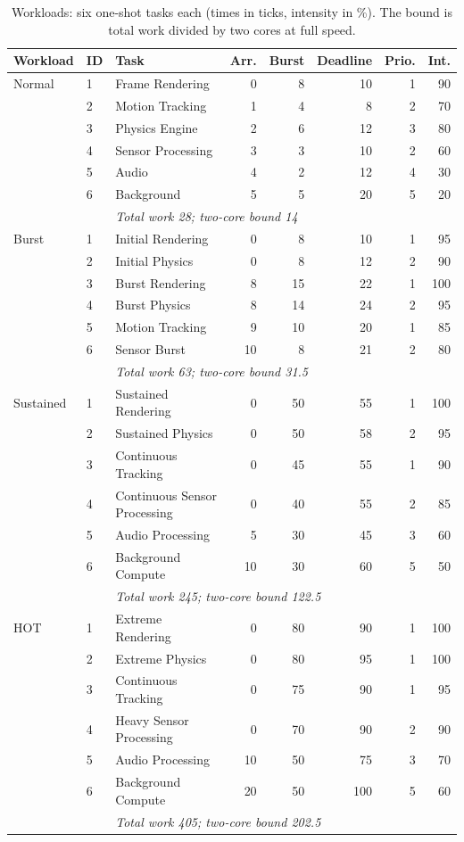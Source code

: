 \documentclass[conference]{IEEEtran}
\begin{document}
\begin{table}[!t]
\centering
\scriptsize
\caption{Workloads: six one-shot tasks each (times in ticks, intensity in \%). The bound is total work divided by two cores at full speed.}
\label{tab:workloads}
\setlength{\tabcolsep}{3pt}
\begin{tabular}{lllrrrrr}
\toprule
Workload & ID & Task & Arr. & Burst & Deadline & Prio. & Int. \\
\midrule
Normal & 1 & Frame Rendering & 0 & 8 & 10 & 1 & 90 \\
 & 2 & Motion Tracking & 1 & 4 & 8 & 2 & 70 \\
 & 3 & Physics Engine & 2 & 6 & 12 & 3 & 80 \\
 & 4 & Sensor Processing & 3 & 3 & 10 & 2 & 60 \\
 & 5 & Audio & 4 & 2 & 12 & 4 & 30 \\
 & 6 & Background & 5 & 5 & 20 & 5 & 20 \\
 & & \multicolumn{6}{l}{\emph{Total work 28; two-core bound 14}} \\
\midrule
Burst & 1 & Initial Rendering & 0 & 8 & 10 & 1 & 95 \\
 & 2 & Initial Physics & 0 & 8 & 12 & 2 & 90 \\
 & 3 & Burst Rendering & 8 & 15 & 22 & 1 & 100 \\
 & 4 & Burst Physics & 8 & 14 & 24 & 2 & 95 \\
 & 5 & Motion Tracking & 9 & 10 & 20 & 1 & 85 \\
 & 6 & Sensor Burst & 10 & 8 & 21 & 2 & 80 \\
 & & \multicolumn{6}{l}{\emph{Total work 63; two-core bound 31.5}} \\
\midrule
Sustained & 1 & Sustained Rendering & 0 & 50 & 55 & 1 & 100 \\
 & 2 & Sustained Physics & 0 & 50 & 58 & 2 & 95 \\
 & 3 & Continuous Tracking & 0 & 45 & 55 & 1 & 90 \\
 & 4 & Continuous Sensor Processing & 0 & 40 & 55 & 2 & 85 \\
 & 5 & Audio Processing & 5 & 30 & 45 & 3 & 60 \\
 & 6 & Background Compute & 10 & 30 & 60 & 5 & 50 \\
 & & \multicolumn{6}{l}{\emph{Total work 245; two-core bound 122.5}} \\
\midrule
HOT & 1 & Extreme Rendering & 0 & 80 & 90 & 1 & 100 \\
 & 2 & Extreme Physics & 0 & 80 & 95 & 1 & 100 \\
 & 3 & Continuous Tracking & 0 & 75 & 90 & 1 & 95 \\
 & 4 & Heavy Sensor Processing & 0 & 70 & 90 & 2 & 90 \\
 & 5 & Audio Processing & 10 & 50 & 75 & 3 & 70 \\
 & 6 & Background Compute & 20 & 50 & 100 & 5 & 60 \\
 & & \multicolumn{6}{l}{\emph{Total work 405; two-core bound 202.5}} \\
\bottomrule
\end{tabular}
\end{table}
\end{document}
